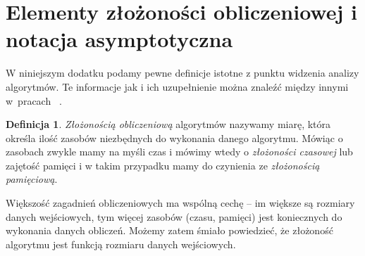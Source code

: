 \documentclass[12pt,a4paper]{book}
\theoremstyle{definition}
\newtheorem{de}{Definicja}[chapter]
\numberwithin{equation}{chapter}
\begin{document}

\renewcommand{\thesection}{\Alph{section}}
\renewcommand\thefigure{\thesection.\arabic{figure}}    
\setcounter{figure}{0} 




\section{Elementy złożoności obliczeniowej i notacja asymptotyczna}\label{dodatek:zlo}

W niniejszym dodatku podamy pewne definicje istotne z punktu widzenia analizy algorytmów. Te informacje jak i ich uzupełnienie można znaleźć między innymi w~pracach~ \cite{CORMEN, KOT, WOJ&PIEN}.
\begin{de}
\textit{Złożonością obliczeniową} algorytmów nazywamy miarę, która określa ilość zasobów niezbędnych do wykonania danego algorytmu. Mówiąc o zasobach zwykle mamy na myśli czas i mówimy wtedy o \textit{złożoności czasowej} lub zajętość pamięci i w takim przypadku mamy do czynienia ze \textit{złożonością pamięciową}.
\end{de}

Większość zagadnień obliczeniowych ma wspólną cechę – im większe są rozmiary danych wejściowych, tym więcej zasobów (czasu, pamięci) jest koniecznych do wykonania danych obliczeń. Możemy zatem śmiało powiedzieć, że złożoność algorytmu jest funkcją rozmiaru danych wejściowych.
\end{document}
